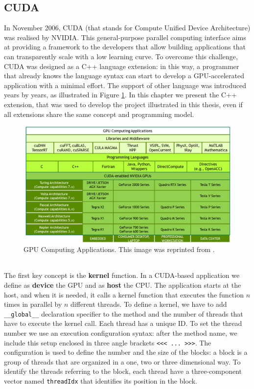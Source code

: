 \subsection{CUDA}
In November 2006, CUDA (that stands for Compute Unified Device Architecture) was realised by NVIDIA. This general-purpose parallel computing interface aims at providing a framework to the developers that allow building applications that can transparently scale with a low learning curve. To overcome this challenge, CUDA was designed as a C++ language extension: in this way, a programmer that already knows the language syntax can start to develop a GPU-accelerated application with a minimal effort. The support of other language was introduced years by years, as illustrated in Figure \ref{fig:gpu-computing-applications}. In this chapter we present the C++ extension, that was used to develop the project illustrated in this thesis, even if all extensions share the same concept and programming model.
\begin{figure}
	\centering
	\includegraphics[width=0.8\linewidth]{0-resources/gpu-computing-applications}
	\caption{GPU Computing Applications. This image was reprinted from \cite{cuda_manual}.}
	\label{fig:gpu-computing-applications}
\end{figure}\\
The first key concept is the \textbf{kernel} function. In a CUDA-based application we define as \textbf{device} the GPU and as \textbf{host} the CPU. The application starts at the host, and when it is needed, it calls a kernel function that executes the function $n$ times in parallel by $n$ different threads. To define a kernel, we have to add \verb|__global__| declaration specifier to the method and the number of threads that have to execute the kernel call. Each thread has a unique ID. To set the thread number we use an execution configuration syntax: after the method name, we include this setup enclosed in three angle brackets \verb|<<< ... >>>|. The configuration is used to define the number and the size of the blocks: a block is a group of threads that are organized in a one, two or three dimensional way. To identify the threads referring to the block, each thread have a three-component vector named \verb|threadIdx| that identifies its position in the block.
